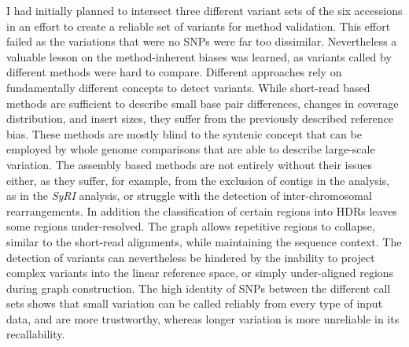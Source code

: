 I had initially planned to intersect three different variant sets of the six accessions in an effort to create a reliable set of variants for method validation. This effort failed as the variations that were no SNPs were far too dissimilar. Nevertheless a valuable lesson on the method-inherent biases was learned, as variants called by different methods were hard to compare. Different approaches rely on fundamentally different concepts to detect variants. While short-read based methods are sufficient to describe small base pair differences, changes in coverage distribution, and insert sizes, they suffer from the previously described reference bias. These methods are mostly blind to the syntenic concept that can be employed by whole genome comparisons that are able to describe large-scale variation. The assembly based methods are not entirely without their issues either, as they suffer, for example, from the exclusion of contigs in the analysis, as in the \textit{SyRI} analysis, or struggle with the detection of inter-chromosomal rearrangements. In addition the classification of certain regions into HDRs leaves some regions under-resolved. The graph allows repetitive regions to collapse, similar to the short-read alignments, while maintaining the sequence context. The detection of variants can nevertheless be hindered by the inability to project complex variants into the linear reference space, or simply under-aligned regions during graph construction. The high identity of SNPs between the different call sets shows that small variation can be called reliably from every type of input data, and are more trustworthy, whereas longer variation is more unreliable in its recallability. \newline
